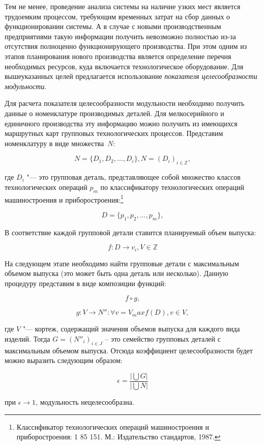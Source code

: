 Тем не менее, проведение анализа системы на наличие узких мест является трудоемким процессом, требующим временных затрат на сбор данных о функционировании системы. А в случае с новыми производственным предприятиями такую информации получить невозможно полностью из-за отсутствия полноценно функционирующего производства. При этом одним из этапов планирования нового производства является определение перечня необходимых ресурсов, куда включается технологическое оборудование. Для вышеуказанных целей предлагается использование \textit{показателя целесообразности модульности}. 

Для расчета показателя целесообразности модульности необходимо получить данные о номенклатуре производимых деталей. Для мелкосерийного и единичного производства эту информацию можно получить из имеющихся маршрутных карт групповых технологических процессов. Представим номенклатуру в виде множества~$N$:

\[
N = \{D_1, D_2, \ldots, D_i\}, N = (D_i)_{i \in \mathbb{Z}},
\]


где $D_i$ "--- это групповая деталь, представляющее собой множество классов технологических операций $p_m$ по классификатору технологических операций машиностроения и приборостроения:\footnote{Классификатор технологических операций машиностроения и приборостроения: 1 85 151. М.: Издательство стандартов, 1987.}

\[
D = \{p_1, p_2, \ldots, p_m\},
\]

\noindent В соответствие каждой групповой детали ставится планируемый объем выпуска:

\[
f: D \rightarrow v_i, V \in \mathbb{Z}
\]

На следующем этапе необходимо найти групповые детали с максимальным объемом выпуска (это может быть одна деталь или несколько). Данную процедуру представим в виде композиции функций:

\[
f \circ g,
\]

\[
g: V \rightarrow N'': \forall v = V_max f(D), v \in V,
\]

\noindent где $V$ "--- кортеж, содержащий значения объемов выпуска для каждого вида изделий. Тогда $G=({N''}_i)_{i \in J}$ -- это семейство групповых деталей с максимальным объемом выпуска.
Отсюда коэффициент целесообразности будет можно выразить следующим образом:

\[
\epsilon = \frac{\big|\bigcup G \big|}{\big|\bigcup N \big|}
\]

\noindent при $\epsilon \rightarrow 1$, модульность нецелесообразна.

